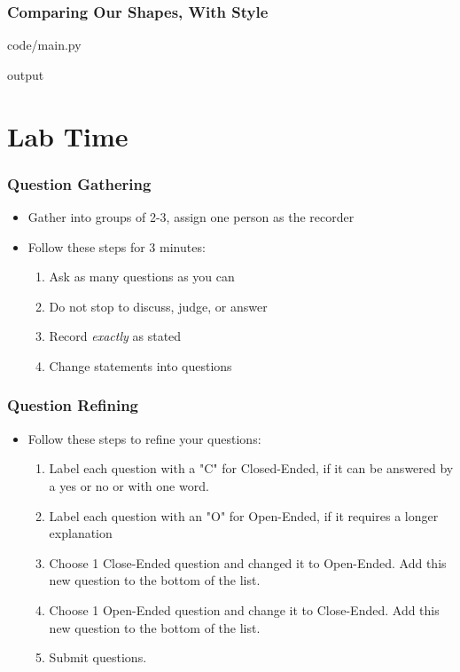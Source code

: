 \documentclass{beamer}
\newcommand{\closenewline}{%
  \par\nopagebreak
  \vspace{-\itemsep}
  \vspace{-\parsep}
}
\begin{document}
  \begin{frame}
    \frametitle{Comparing Our Shapes, With Style}

    code/main.py
    
    \closenewline
    
    \closenewline
    
    \closenewline
    

    output
    
    \closenewline
    
    \closenewline
    
  \end{frame}

\section{Lab Time}
\begin{frame}
  \frametitle{Question Gathering}
  \begin{itemize}
    \item Gather into groups of 2-3, assign one person as the recorder
    \item Follow these steps for 3 minutes:
      \begin{enumerate}
        \item Ask as many questions as you can
        \item Do not stop to discuss, judge, or answer
        \item Record \textit{exactly} as stated
        \item Change statements into questions
      \end{enumerate}
  \end{itemize}
\end{frame}

\begin{frame}
  \frametitle{Question Refining}
  \begin{itemize}
    \item Follow these steps to refine your questions:
      \begin{enumerate}
        \item Label each question with a "C" for Closed-Ended, if it can be answered by a yes or no or with one word.
        \item Label each question with an "O" for Open-Ended, if it requires a longer explanation
        \item Choose 1 Close-Ended question and changed it to Open-Ended. Add this new question to the bottom of the list.
        \item Choose 1 Open-Ended question and change it to Close-Ended. Add this new question to the bottom of the list.
        \item Submit questions.
      \end{enumerate}
  \end{itemize}
\end{frame}
\end{document}
